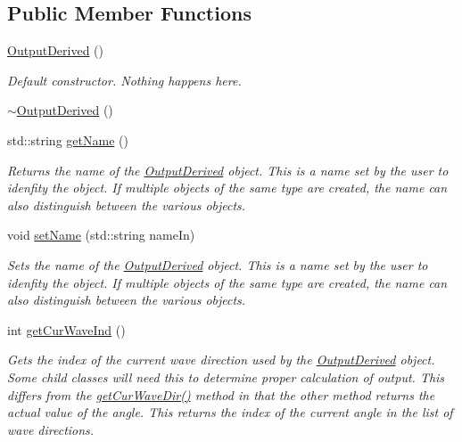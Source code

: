 \subsection*{Public Member Functions}
\begin{DoxyCompactItemize}
\item 
\hypertarget{classosea_1_1ofreq_1_1_output_derived_af8b70b70b8a5089f2b673da8b59a7b6a}{\hyperlink{classosea_1_1ofreq_1_1_output_derived_af8b70b70b8a5089f2b673da8b59a7b6a}{Output\-Derived} ()}\label{classosea_1_1ofreq_1_1_output_derived_af8b70b70b8a5089f2b673da8b59a7b6a}

\begin{DoxyCompactList}\small\item\em Default constructor. Nothing happens here. \end{DoxyCompactList}\item 
\hyperlink{classosea_1_1ofreq_1_1_output_derived_a4dde733443e52964c74d8bb6477f85f7}{$\sim$\-Output\-Derived} ()
\item 
std\-::string \hyperlink{classosea_1_1ofreq_1_1_output_derived_a354f906f29b96022141afba02a50fbfe}{get\-Name} ()
\begin{DoxyCompactList}\small\item\em Returns the name of the \hyperlink{classosea_1_1ofreq_1_1_output_derived}{Output\-Derived} object. This is a name set by the user to idenfity the object. If multiple objects of the same type are created, the name can also distinguish between the various objects. \end{DoxyCompactList}\item 
void \hyperlink{classosea_1_1ofreq_1_1_output_derived_ac4db0b795c3bbb79072bce39e78b4d44}{set\-Name} (std\-::string name\-In)
\begin{DoxyCompactList}\small\item\em Sets the name of the \hyperlink{classosea_1_1ofreq_1_1_output_derived}{Output\-Derived} object. This is a name set by the user to idenfity the object. If multiple objects of the same type are created, the name can also distinguish between the various objects. \end{DoxyCompactList}\item 
int \hyperlink{classosea_1_1ofreq_1_1_output_derived_ad4bb95c9693b2f34a40eb0136f2a13f4}{get\-Cur\-Wave\-Ind} ()
\begin{DoxyCompactList}\small\item\em Gets the index of the current wave direction used by the \hyperlink{classosea_1_1ofreq_1_1_output_derived}{Output\-Derived} object. Some child classes will need this to determine proper calculation of output. This differs from the \hyperlink{classosea_1_1ofreq_1_1_output_derived_ad59fff8dc8f1772039aff4950a3cdf18}{get\-Cur\-Wave\-Dir()} method in that the other method returns the actual value of the angle. This returns the index of the current angle in the list of wave directions. \end{DoxyCompactList}\item 

\end{DoxyCompactItemize}
